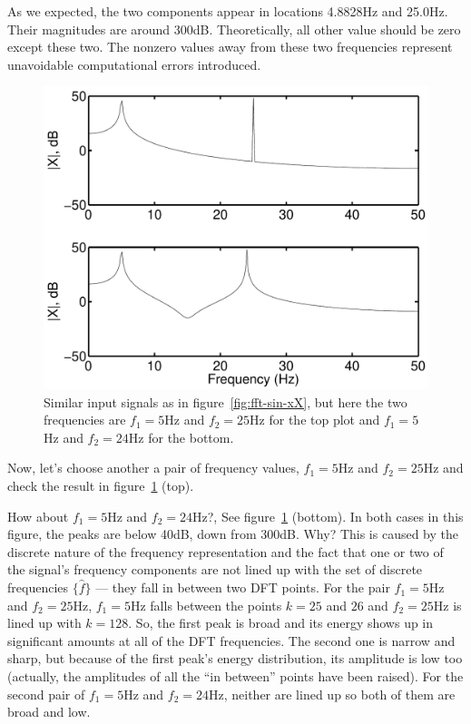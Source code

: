 As we expected, the two components appear in locations 4.8828Hz and
25.0Hz. Their magnitudes are around 300dB. Theoretically, all other
value should be zero except these two. The nonzero values away from
these two frequencies represent unavoidable computational errors
introduced.

\begin{figure}
\centerline{\includegraphics[width=5in]{ch-fft/fft-leakage}}
\caption[Sum of two sinusoids $x$ with $N=512$ samples and its  
FFT $|X|$; different frequencies]{Similar input signals as in
figure~\protect\ref{fig:fft-sin-xX}, but here the two frequencies are
$f_1=5$Hz and $f_2=25$Hz for the top plot and $f_1=5$Hz and $f_2=24$Hz
for the bottom.
\label{fig:fft-leakage}}
\end{figure}

Now, let's choose another a pair of frequency values, $f_1=5$Hz and
$f_2=25$Hz and check the result in figure~\ref{fig:fft-leakage} (top).

How about $f_1=5$Hz and $f_2=24$Hz?, See figure~\ref{fig:fft-leakage}
(bottom). In both cases in this figure, the peaks are below 40dB, down
from 300dB. Why? This is caused by the discrete nature of the
frequency representation and the fact that one or two of the signal's
frequency components are not lined up with the set of discrete
frequencies $\{\hat{f}\}$ --- they fall in between two DFT points. For
the pair $f_1=5$Hz and $f_2=25$Hz, $f_1=5$Hz falls between the points
$k=25$ and $26$ and $f_2=25$Hz is lined up with $k=128$. So, the first
peak is broad and its energy shows up in significant amounts at all of
the DFT frequencies.  The second one is narrow and sharp, but because
of the first peak's energy distribution, its amplitude is low too
(actually, the amplitudes of all the ``in between'' points have been
raised). For the second pair of $f_1=5$Hz and $f_2=24$Hz, neither are
lined up so both of them are broad and low.

